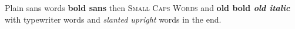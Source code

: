 \documentclass{article}
\begin{document}
Plain {\sffamily sans words \bfseries bold sans} then {\scshape Small Caps Words} and {\bf old bold \it old italic} with {\ttfamily typewriter words} and {\slshape slanted \upshape upright} words in the end.
\end{document}

